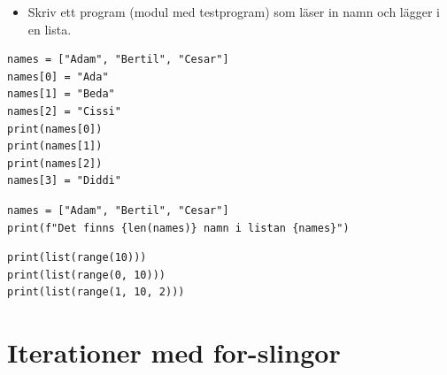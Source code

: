 \begin{frame}[fragile]
  \begin{example}
    \inputminted{python}{examples/extend_lists.py}
  \end{example}
\end{frame}

\begin{frame}[fragile]
  \begin{exercise}
    \begin{itemize}
      \item Skriv ett program (modul med testprogram) som läser in namn och 
        lägger i en lista.
    \end{itemize}
  \end{exercise}
\end{frame}

\begin{frame}[fragile]
  \begin{example}
    \begin{verbatim}
names = ["Adam", "Bertil", "Cesar"]
names[0] = "Ada"
names[1] = "Beda"
names[2] = "Cissi"
print(names[0])
print(names[1])
print(names[2])
names[3] = "Diddi"
    \end{verbatim}
  \end{example}
\end{frame}

\begin{frame}[fragile]
  \begin{example}
    \begin{verbatim}
names = ["Adam", "Bertil", "Cesar"]
print(f"Det finns {len(names)} namn i listan {names}")
    \end{verbatim}
  \end{example}
\end{frame}

\begin{frame}[fragile]
  \begin{example}
    \begin{verbatim}
print(list(range(10)))
print(list(range(0, 10)))
print(list(range(1, 10, 2)))
    \end{verbatim}
  \end{example}
\end{frame}


\section{Iterationer med for-slingor}

